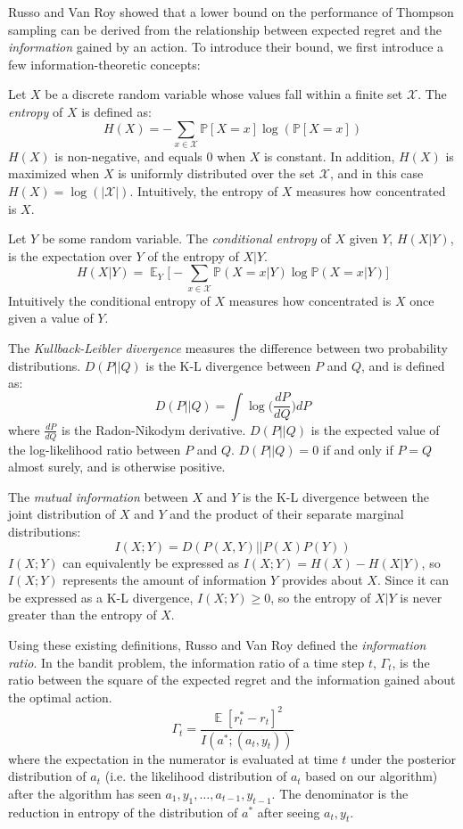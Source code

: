 \documentclass{article}
\DeclareMathOperator{\EX}{\mathbb{E}}
\newcommand{\p}{\mathbb{P}}
\begin{document}
Russo and Van Roy showed that a lower bound on the performance of Thompson sampling can be derived from the relationship between expected regret and the \textit{information} gained by an action. To introduce their bound, we first introduce a few information-theoretic concepts:

Let $X$ be a discrete random variable whose values fall within a finite set $\mathcal{X}$. The \textit{entropy} of $X$ is defined as:
$$H(X) = -\sum_{x\in\mathcal{X}} \p[X=x]\log(\p[X=x])$$
$H(X)$ is non-negative, and equals $0$ when $X$ is constant. In addition, $H(X)$ is maximized when $X$ is uniformly distributed over the set $\mathcal{X}$, and in this case $H(X) = \log(|\mathcal{X}|)$. Intuitively, the entropy of $X$ measures how concentrated is $X$.

Let $Y$ be some random variable. The \textit{conditional entropy} of $X$ given $Y$, $H(X|Y)$, is the expectation over $Y$ of the entropy of $X|Y$. 
$$H(X|Y) = \EX_Y\bigg[-\sum_{x\in\mathcal{X}} \p(X=x|Y)\log\p(X=x|Y)\bigg]$$
Intuitively the conditional entropy of $X$ measures how concentrated is $X$ once given a value of $Y$.

The \textit{Kullback-Leibler divergence} measures the difference between two probability distributions. $D(P||Q)$ is the K-L divergence between $P$ and $Q$, and is defined as:
$$D(P||Q) = \int \log\bigg(\frac{dP}{dQ}\bigg)dP$$
where $\frac{dP}{dQ}$ is the Radon-Nikodym derivative. $D(P||Q)$ is the expected value of the log-likelihood ratio between $P$ and $Q$. $D(P||Q) = 0$ if and only if $P=Q$ almost surely, and is otherwise positive.

The \textit{mutual information} between $X$ and $Y$ is the K-L divergence between the joint distribution of $X$ and $Y$ and the product of their separate marginal distributions:
$$I(X;Y) = D(P(X, Y)||P(X)P(Y))$$
$I(X;Y)$ can equivalently be expressed as $I(X;Y) = H(X) - H(X|Y)$, so $I(X;Y)$ represents the amount of information $Y$ provides about $X$. Since it can be expressed as a K-L divergence, $I(X;Y)\geq 0$, so the entropy of $X|Y$ is never greater than the entropy of $X$.

Using these existing definitions, Russo and Van Roy defined the \textit{information ratio}. In the bandit problem, the information ratio of a time step $t$, $\Gamma_t$, is the ratio between the square of the expected regret and the information gained about the optimal action.
$$\Gamma_t = \frac{\EX[r^*_t - r_t]^2}{I(a^*; (a_t, y_t))}$$
where the expectation in the numerator is evaluated at time $t$ under the posterior distribution of $a_t$ (i.e. the likelihood distribution of $a_t$ based on our algorithm) after the algorithm has seen $a_1, y_1, \ldots, a_{t-1}, y_{t-1}$. The denominator is the reduction in entropy of the distribution of $a^*$ after seeing $a_t, y_t$.
\end{document}
